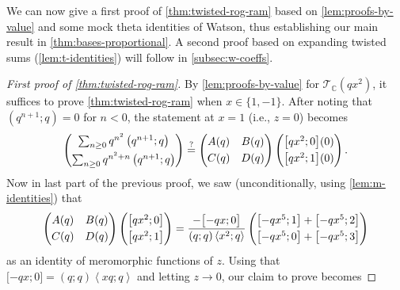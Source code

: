 \documentclass[reqno,11pt]{amsart}
\theoremstyle{definition}
\theoremstyle{remark}
\numberwithin{equation}{section}
\newcommand{\C}{\mathbb{C}}
\newcommand{\mT}{\mathcal{T}}
\newcommand{\la}{\left\langle}
\newcommand{\ra}{\right\rangle}
\newcommand{\vect}[2]{\big[{#1};{#2}\big]}
\begin{document}
We can now give a first proof of \cref{thm:twisted-rog-ram} based on \cref{lem:proofs-by-value} and some mock theta identities of Watson, thus establishing our main result in \cref{thm:bases-proportional}. A second proof based on expanding twisted sums (\cref{lem:t-identities}) will follow in \cref{subsec:w-coeffs}.

\begin{proof}[First proof of \cref{thm:twisted-rog-ram}]
By \cref{lem:proofs-by-value} for $\mT_\C\left(qx^2\right)$, it suffices to prove \cref{thm:twisted-rog-ram} when $x \in \{1, -1\}$. After noting that $\left(q^{n+1}; q\right) = 0$ for $n < 0$, the statement at $x = 1$ (i.e., $z = 0$) becomes
\[
    \begin{pmatrix}
    \sum_{n \ge 0} q^{n^2}\left(q^{n+1}; q\right) \vspace{0.1cm} \\ 
    \sum_{n \ge 0} q^{n^2 + n}\left(q^{n+1}; q\right)
    \end{pmatrix}
    \stackrel{?}{=} 
    \begin{pmatrix}
    A(q) & B(q) \vspace{0.1cm}\\
    C(q) & D(q)
    \end{pmatrix}
    \begin{pmatrix}
    \vect{qx^2}{0}(0)\vspace{0.1cm} \\
    \vect{qx^2}{1}(0)
    \end{pmatrix}.
\]
Now in last part of the previous proof, we saw (unconditionally, using \cref{lem:m-identities}) that 
\[
    \begin{pmatrix}
    A(q) & B(q) \vspace{0.1cm}\\
    C(q) & D(q)
    \end{pmatrix}
    \begin{pmatrix}
    \vect{qx^2}{0}\vspace{0.1cm} \\
    \vect{qx^2}{1}
    \end{pmatrix}
    =
    \frac{-\vect{-qx}{0}}{(q; q)\la x^2; q \ra}
    \begin{pmatrix}
    \vect{-qx^5}{1} + \vect{-qx^5}{2} 
    \vspace{0.1cm} \\
    \vect{-qx^5}{0} + \vect{-qx^5}{3} 
    \end{pmatrix}
\]
as an identity of meromorphic functions of $z$. Using that $\vect{-qx}{0} = (q; q)\la xq; q\ra$ and letting $z \to 0$, our claim to prove becomes

\end{proof}
\end{document}
